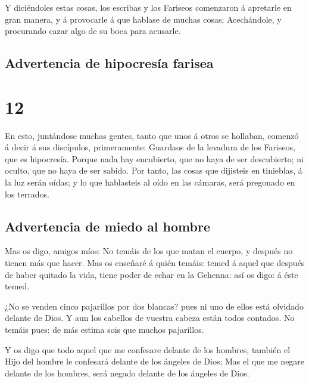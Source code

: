  Y diciéndoles estas cosas, los escribas y los Fariseos
comenzaron á apretarle en gran manera, y á provocarle á que hablase de
muchas cosas;  Acechándole, y procurando cazar algo de su
boca para acusarle.

\hypertarget{advertencia-de-hipocresuxeda-farisea}{%
\subsection{Advertencia de hipocresía
farisea}\label{advertencia-de-hipocresuxeda-farisea}}

\hypertarget{section-42-12}{%
\section{12}\label{section-42-12}}

 En esto, juntándose muchas gentes, tanto que unos á otros
se hollaban, comenzó á decir á sus discípulos, primeramente: Guardaos de
la levadura de los Fariseos, que es hipocresía.  Porque
nada hay encubierto, que no haya de ser descubierto; ni oculto, que no
haya de ser sabido.  Por tanto, las cosas que dijisteis en
tinieblas, á la luz serán oídas; y lo que hablasteis al oído en las
cámaras, será pregonado en los terrados.

\hypertarget{advertencia-de-miedo-al-hombre}{%
\subsection{Advertencia de miedo al
hombre}\label{advertencia-de-miedo-al-hombre}}

 Mas os digo, amigos míos: No temáis de los que matan el
cuerpo, y después no tienen más que hacer.  Mas os
enseñaré á quién temáis: temed á aquel que después de haber quitado la
vida, tiene poder de echar en la Gehenna: así os digo: á éste temed.

 ¿No se venden cinco pajarillos por dos blancas? pues ni
uno de ellos está olvidado delante de Dios.  Y aun los
cabellos de vuestra cabeza están todos contados. No temáis pues: de más
estima sois que muchos pajarillos.

 Y os digo que todo aquel que me confesare delante de los
hombres, también el Hijo del hombre le confesará delante de los ángeles
de Dios;  Mas el que me negare delante de los hombres,
será negado delante de los ángeles de Dios.

